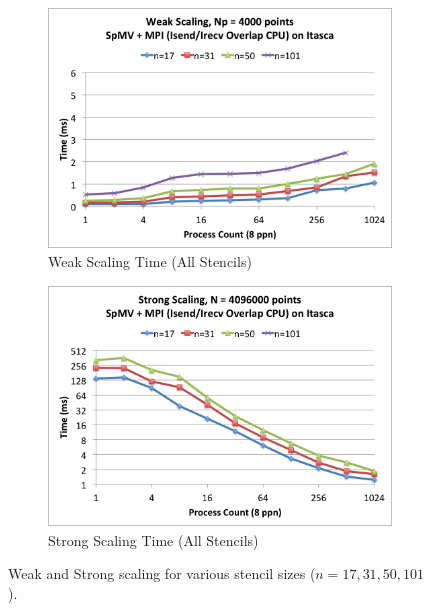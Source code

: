 \documentclass{report}
\begin{document}
\begin{figure}
\centering
\begin{subfigure}{0.48\textwidth}
\centering
\includegraphics[width=\textwidth]{performance_content/scaling/weak_scaling_np4000_overlap_cpu_SpMV_and_comm_all_stencils.png}
\caption{Weak Scaling Time (All Stencils)}
\label{fig:compare_weak_scaling_all_stencils}
\end{subfigure}
\begin{subfigure}{0.48\textwidth}
\centering
\includegraphics[width=\textwidth]{performance_content/scaling/strong_scaling_4M_overlap_cpu_SpMV_and_comm_all_stencils.png}
\caption{Strong Scaling Time (All Stencils)}
\label{fig:compare_strong_scaling_all_stencils}
\end{subfigure}
\caption{Weak and Strong scaling for various stencil sizes ($n=17, 31, 50, 101$). } 
\label{fig:weak_scaling_all_stencils}
\end{figure}
\end{document}

